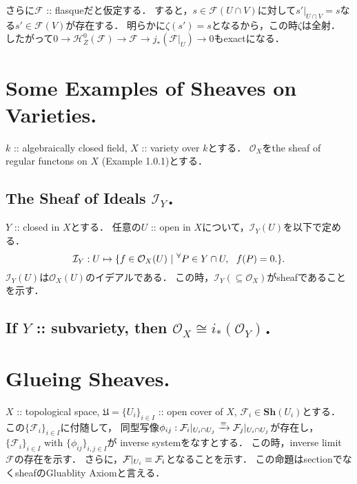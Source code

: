 \documentclass[a4paper]{jsarticle}
\newcommand{\shF}{\mathcal{F}}
\newcommand{\shI}{\mathcal{I}}
\newcommand{\Sh}{\mathbf{Sh}}
\begin{document}
    さらに$\shF$ :: flasqueだと仮定する．
    すると，$s \in \shF(U \cap V)$に対して$s'|_{U \cap V}=s$なる$s' \in \shF(V)$が存在する．
    明らかに$\zeta(s')=s$となるから，この時$\zeta$は全射．
    したがって$0 \to \mathscr{H}_Z^0(\shF) \to \shF \to j_*(\shF|_U) \to 0$もexactになる．

\section{Some Examples of Sheaves on Varieties.} %
    $k$ :: algebraically closed field, $X$ :: variety over $k$とする．
    $\mathcal{O}_X$をthe sheaf of regular functons on $X$ (Example 1.0.1)とする．
    \subsection{The Sheaf of Ideals $\shI_Y$．}
    $Y$ :: closed in $X$とする．
    任意の$U$ :: open in $X$について，$\shI_Y(U)$を以下で定める．
    \[ \shI_Y: U \mapsto \{ f \in \mathcal{O}_X(U) ~|~ \Forall{P \in Y \cap U} f(P)=0. \}. \]
    $\shI_Y(U)$は$\mathcal{O}_X(U)$のイデアルである．
    この時，$\shI_Y (\subseteq \mathcal{O}_X)$がsheafであることを示す．

    \subsection{If $Y$ :: subvariety, then $\mathcal{O}_X \cong i_*(\mathcal{O}_Y)$．}

    \subsection{ }
    \subsection{ }
    \subsection{ }

\section{Glueing Sheaves.} %
    $X$ :: topological space, 
    $\mathfrak{U}=\{U_i\}_{i \in I}$ :: open cover of $X$,
    $\shF_i \in \Sh(U_i)$とする．
    この$\{\shF_i\}_{i \in I}$に付随して，
    同型写像$\phi_{ij}: \shF_i|_{U_i \cap U_j} \isomap \shF_j|_{U_i \cap U_j}$が存在し，
    $\{\shF_i\}_{i \in I}$ with $\{\phi_{ij}\}_{i,j \in I}$が
    inverse systemをなすとする．
    この時，inverse limit $\shF$の存在を示す．
    さらに，$\shF|_{U_i} \iso \shF_i$となることを示す．
    この命題はsectionでなくsheafのGluablity Axiomと言える．
 
\end{document}
